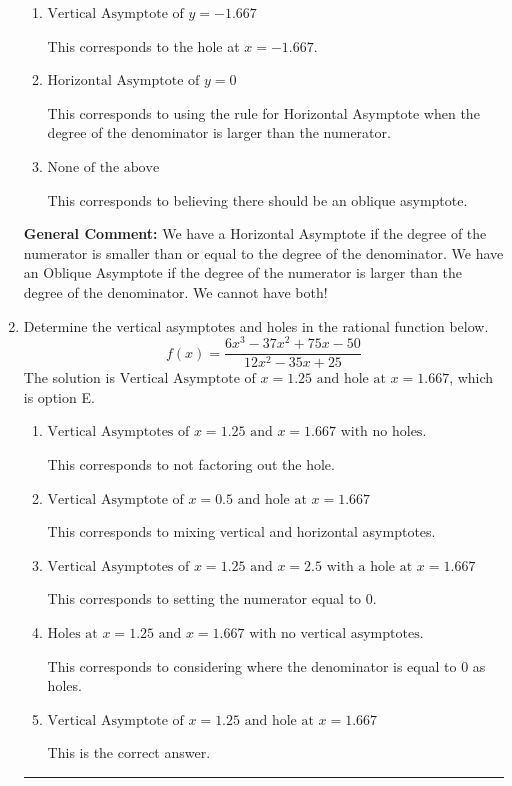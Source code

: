 \documentclass{extbook}[14pt]
\newcommand{\litem}[1]{\item #1

\rule{\textwidth}{0.4pt}}
\begin{document}
\begin{enumerate}
{\begin{enumerate}[label=\Alph*.]
This corresponds to the hole at $x = 2$.
\item \( \text{Vertical Asymptote of } y = -1.667  \)

This corresponds to the hole at $x = -1.667$.
\item \( \text{Horizontal Asymptote of } y = 0  \)

This corresponds to using the rule for Horizontal Asymptote when the degree of the denominator is larger than the numerator.
\item \( \text{None of the above} \)

This corresponds to believing there should be an oblique asymptote.
\end{enumerate}

\textbf{General Comment:} We have a Horizontal Asymptote if the degree of the numerator is smaller than or equal to the degree of the denominator. We have an Oblique Asymptote if the degree of the numerator is larger than the degree of the denominator. We cannot have both!
}
\litem{
Determine the vertical asymptotes and holes in the rational function below.
\[ f(x) = \frac{6x^{3} -37 x^{2} +75 x -50}{12x^{2} -35 x + 25} \]The solution is \( \text{Vertical Asymptote of } x = 1.25 \text{ and hole at } x = 1.667 \), which is option E.\begin{enumerate}[label=\Alph*.]
\item \( \text{Vertical Asymptotes of } x = 1.25 \text{ and } x = 1.667 \text{ with no holes.} \)

This corresponds to not factoring out the hole.
\item \( \text{Vertical Asymptote of } x = 0.5 \text{ and hole at } x = 1.667 \)

This corresponds to mixing vertical and horizontal asymptotes.
\item \( \text{Vertical Asymptotes of } x = 1.25 \text{ and } x = 2.5 \text{ with a hole at } x = 1.667 \)

This corresponds to setting the numerator equal to 0.
\item \( \text{Holes at } x = 1.25 \text{ and } x = 1.667 \text{ with no vertical asymptotes.} \)

This corresponds to considering where the denominator is equal to 0 as holes.
\item \( \text{Vertical Asymptote of } x = 1.25 \text{ and hole at } x = 1.667 \)

This is the correct answer.
\end{enumerate}

}
\end{enumerate}
\end{document}
